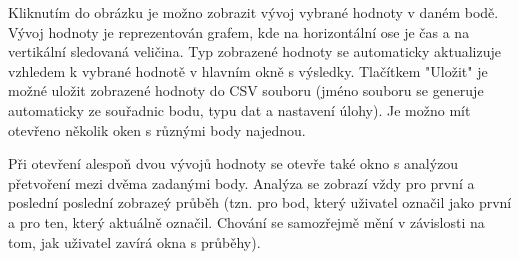 \documentclass[a4paper,12pt]{article}
\begin{document}
Kliknutím do obrázku je možno zobrazit vývoj vybrané hodnoty v daném bodě. Vývoj hodnoty je reprezentován grafem, kde na horizontální ose je čas a na vertikální sledovaná veličina. Typ zobrazené hodnoty se automaticky aktualizuje vzhledem k vybrané hodnotě v hlavním okně s výsledky. Tlačítkem "Uložit" je možné uložit zobrazené hodnoty do CSV souboru (jméno souboru se generuje automaticky ze souřadnic bodu, typu dat a nastavení úlohy). Je možno mít otevřeno několik oken s různými body najednou.
\begin{figure}[H]
\end{figure}
Při otevření alespoň dvou vývojů hodnoty se otevře také okno s analýzou přetvoření mezi dvěma zadanými body. Analýza se zobrazí vždy pro první a poslední poslední zobrazeý průběh (tzn. pro bod, který uživatel označil jako první a pro ten, který aktuálně označil. Chování se samozřejmě mění v závislosti na tom, jak uživatel zavírá okna s průběhy).
\newpage
\end{document}
